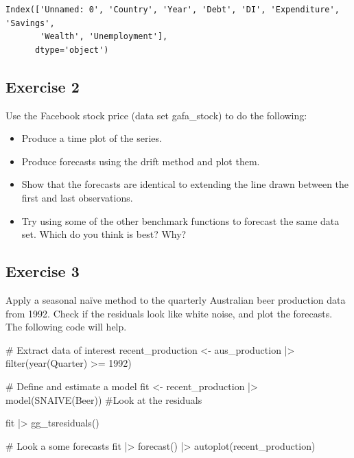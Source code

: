 \documentclass[
  11pt,
]{article}
\newenvironment{Shaded}{\begin{snugshade}}{\end{snugshade}}
\newcommand{\NormalTok}[1]{\textcolor[rgb]{0.00,0.23,0.31}{#1}}
\begin{document}
\begin{Shaded}
\begin{Highlighting}[]

\end{Highlighting}
\end{Shaded}

\begin{verbatim}
Index(['Unnamed: 0', 'Country', 'Year', 'Debt', 'DI', 'Expenditure', 'Savings',
       'Wealth', 'Unemployment'],
      dtype='object')
\end{verbatim}

\subsection{Exercise 2}\label{exercise-2}

Use the Facebook stock price (data set gafa\_stock) to do the following:

\begin{itemize}
\item
  Produce a time plot of the series.
\item
  Produce forecasts using the drift method and plot them.
\item
  Show that the forecasts are identical to extending the line drawn
  between the first and last observations.
\item
  Try using some of the other benchmark functions to forecast the same
  data set. Which do you think is best? Why?
\end{itemize}

\subsection{Exercise 3}\label{exercise-3}

Apply a seasonal naïve method to the quarterly Australian beer
production data from 1992. Check if the residuals look like white noise,
and plot the forecasts. The following code will help.

\begin{Shaded}
\begin{Highlighting}[]
\NormalTok{\# Extract data of interest}
\NormalTok{recent\_production \textless{}{-} aus\_production |\textgreater{}}
\NormalTok{  filter(year(Quarter) \textgreater{}= 1992)}

\NormalTok{\# Define and estimate a model}
\NormalTok{fit \textless{}{-} recent\_production |\textgreater{} model(SNAIVE(Beer))}
\NormalTok{\#Look at the residuals}

\NormalTok{fit |\textgreater{} gg\_tsresiduals()}

\NormalTok{\# Look a some forecasts}
\NormalTok{fit |\textgreater{} forecast() |\textgreater{} autoplot(recent\_production)}
\end{Highlighting}
\end{Shaded}
\end{document}
